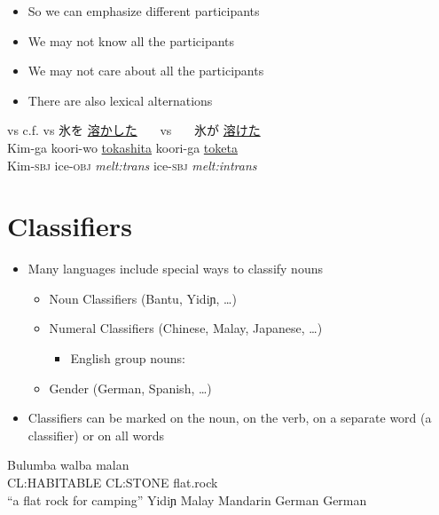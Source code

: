 \documentclass[headrule,footrule]{foils}
\begin{document}

\begin{itemize}
\item So we can emphasize different participants
\item We may not know all the participants
\item We may not care about all the participants
\item There are also lexical alternations
\end{itemize}
\begin{exe}
\ex {} vs 
\ex c.f.  vs 
\makexeCJKactive
\ex \glll {} 氷を \ul{溶かした}  {~~~vs~~~}  氷が \ul{溶けた} \\ 
\makexeCJKinactive
Kim-ga koori-wo \ul{tokashita}  {} koori-ga \ul{toketa} \\
  Kim-\textsc{sbj} ice-\textsc{obj} \textit{melt:trans} 
{} ice-\textsc{sbj} \textit{melt:intrans} \\
\end{exe}


\section{Classifiers}

\MyLogo{}
\begin{itemize}
\item  Many languages include special ways to classify 
nouns
\begin{itemize}
\item  Noun Classifiers (Bantu, {\ipafont Yidiɲ}, \ldots) 
\item  Numeral Classifiers (Chinese, Malay, Japanese, \ldots)
  \begin{itemize}
  \item English group nouns: 
  \end{itemize}
\item  Gender (German, Spanish, \ldots)  
\end{itemize}
\item Classifiers can be marked on the noun, on the verb, on a
  separate word (a classifier) or on all words
\end{itemize}

\begin{exe}
  \ex \gll Bulumba walba      malan \\
  CL:HABITABLE CL:STONE  flat.rock \\
  \trans ``a flat rock for camping'' \hfill {\ipafont Yidiɲ}  \citep{Dixon:1977}
  \ex {} \hfill Malay
  \ex {}  \hfill Mandarin
  \ex {} \hfill German
  \ex {}\hfill German
\end{exe}
\end{document}
